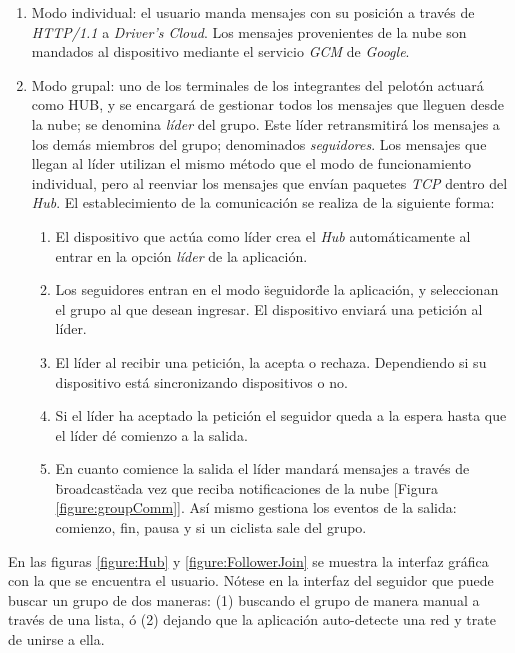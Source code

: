 \begin{enumerate}
	\item Modo individual: el usuario manda mensajes con su posición a través de
	\emph{HTTP/1.1} a \emph{Driver's Cloud}. Los mensajes provenientes de la nube
	son mandados al dispositivo mediante el servicio \emph{GCM} de \emph{Google}.

	\item Modo grupal: uno de los terminales de los integrantes del pelotón actuará
	como HUB, y se encargará de	gestionar todos los mensajes que lleguen desde la
	nube; se denomina \emph{líder} del grupo. Este líder retransmitirá los mensajes
	a los demás miembros del grupo; denominados \emph{seguidores}. Los mensajes que
	llegan al líder utilizan el mismo método que el modo de funcionamiento individual,
	pero al reenviar los mensajes que envían paquetes \emph{TCP} dentro del
	\emph{Hub}. El establecimiento de la comunicación se realiza de la siguiente
	forma:

	\begin{enumerate}
		\item El dispositivo que actúa como líder crea el \emph{Hub} automáticamente
		al entrar en la opción \emph{líder} de la aplicación.

		\item Los seguidores entran en el modo \"seguidor\" de la aplicación, y seleccionan
		el grupo al que desean ingresar. El dispositivo enviará una petición al líder.

		\item El líder al recibir una petición, la acepta o rechaza. Dependiendo si
		su dispositivo está sincronizando dispositivos o no.

		\item Si el líder ha aceptado la petición el seguidor queda a la espera hasta
		que el líder dé comienzo a la salida.

		\item En cuanto comience la salida el líder mandará mensajes a través de \"broadcast\"
		cada vez que reciba notificaciones de la nube [Figura \ref{figure:groupComm}]. Así mismo
		gestiona los eventos de la salida: comienzo, fin, pausa y si un ciclista sale del grupo.
	\end{enumerate}
\end{enumerate}

En las figuras \ref{figure:Hub} y \ref{figure:FollowerJoin} se muestra la interfaz
gráfica con la que se encuentra el usuario. Nótese en la interfaz del seguidor
que puede buscar un grupo de dos maneras: (1) buscando el grupo de manera manual
a través de una lista, ó (2) dejando que la aplicación auto-detecte una red y trate
de unirse a ella.


